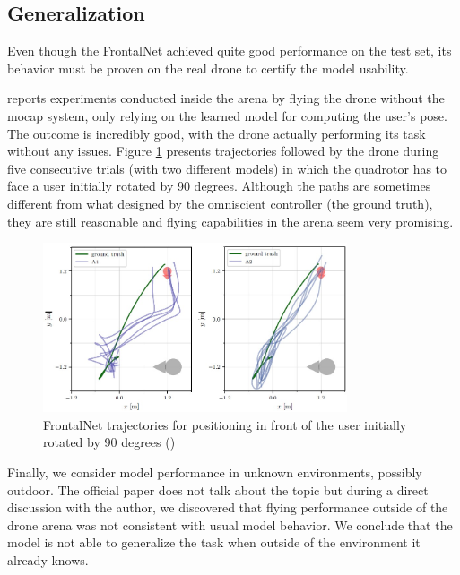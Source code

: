 \subsection{Generalization}
\label{subsec:frontalnet-generalization}

Even though the FrontalNet achieved quite good performance on the test set, its behavior must be proven on the real drone to certify the model usability.

\cite{mantegazza2019visionbased} reports experiments conducted inside the arena by flying the drone without the \gls{mocap} system, only relying on the learned model for computing the user's pose. The outcome is incredibly good, with the drone actually performing its task without any issues. Figure \ref{fig:frontalnet-trajectories} presents trajectories followed by the drone during five consecutive trials (with two different models) in which the quadrotor has to face a user initially rotated by 90 degrees. Although the paths are sometimes different from what designed by the omniscient controller (the ground truth), they are still reasonable and flying capabilities in the arena seem very promising.

\begin{figure}[!htb]
	\centering
	\includegraphics[width=0.8\textwidth]{"contents/images/03-frontalnet-trajectories"}
	\caption[FrontalNet trajectories for positioning in front of the user initially rotated by 90 degrees (\cite{mantegazza2019visionbased})]{FrontalNet trajectories for positioning in front of the user initially rotated by 90 degrees (\cite{mantegazza2019visionbased})}
	\label{fig:frontalnet-trajectories}
\end{figure}

\medskip

Finally, we consider model performance in unknown environments, possibly outdoor. The official paper does not talk about the topic but during a direct discussion with the author, we discovered that flying performance outside of the drone arena was not consistent with usual model behavior. We conclude that the model is not able to generalize the task when outside of the environment it already knows.

